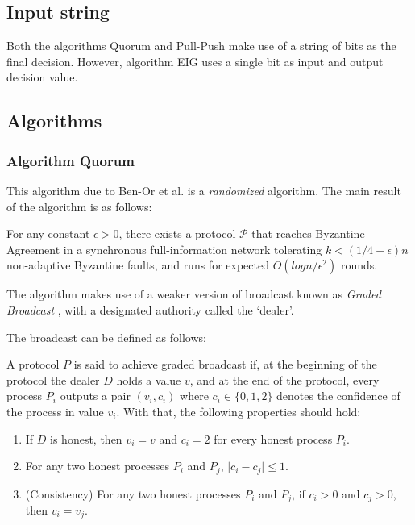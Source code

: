 \subsection{Input string}
Both the algorithms Quorum and Pull-Push  make use of a string of bits as the final decision. However, algorithm EIG uses a single bit as input and output decision value.


\subsection{Algorithms}
\subsubsection{Algorithm Quorum}
This algorithm due to Ben-Or et al. \cite{BPV06} is a \textit{randomized} algorithm. The main result of the algorithm is as follows:
\begin{theorem}
For any constant $\epsilon > 0$, there exists a protocol $\mathcal{P}$ that reaches Byzantine Agreement in a synchronous full-information network tolerating $k < (1/4 - \epsilon) n$ non-adaptive Byzantine faults, and runs for expected $O(logn/\epsilon^2)$ rounds. 
\end{theorem}

%

The algorithm makes use of a weaker version of broadcast known as \textit{Graded Broadcast} \cite{FM97}, with a designated authority called the `dealer'.

The broadcast can be defined as follows:
\begin{definition}
A protocol $P$ is said to achieve graded broadcast if, at the beginning of the protocol the dealer $D$ holds a value $v$, and at the end of the protocol, every process $P_i$ outputs a pair $(v_i, c_i)$ where $c_i \in \{0, 1, 2\}$ denotes the confidence of the process in value $v_i$. With that, the following properties should hold:
\begin{enumerate}
\item If $D$ is honest, then $v_i = v$ and $c_i = 2$ for every honest process $P_i$. 
\item For any two honest processes $P_i$ and $P_j$, $\mid c_i - c_j \mid \leq 1$.
\item (Consistency) For any two honest processes $P_i$ and $P_j$, if $c_i > 0$ and $c_j > 0$, then $v_i = v_j$.
\end{enumerate}
\end{definition}

